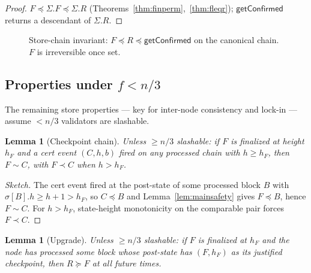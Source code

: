 \documentclass{article}
\newcommand{\genesis}{\ensuremath{B_{\mathrm{gen}}}}
\newcommand{\getConfirmed}{\textsf{getConfirmed}\xspace}
\theoremstyle{plain}
\newtheorem{lemma}[theorem]{Lemma}
\theoremstyle{definition}
\theoremstyle{remark}
\begin{document}
\begin{proof}[Proof] $F \preceq \Sigma.F \preceq \Sigma.R$ (Theorems~\ref{thm:finperm},~\ref{thm:fleqr}); $\getConfirmed$ returns a descendant of $\Sigma.R$. \end{proof}

\begin{figure}[H]
\centering
{}
\caption{Store-chain invariant: $F \preceq R \preceq \getConfirmed$ on the canonical chain. $F$ is irreversible once set.}\label{fig:store-chain}
\end{figure}

\subsection{Properties under $f < n/3$}

The remaining store properties --- key for inter-node consistency and lock-in --- assume $< n/3$ validators are slashable.

\begin{lemma}[Checkpoint chain]\label{lem:certchain}
Unless $\geq n/3$ slashable: if $F$ is finalized at height $h_F$ and a cert event $(C, h, b)$ fired on any processed chain with $h \geq h_F$, then $F \sim C$, with $F \prec C$ when $h > h_F$.
\end{lemma}

\begin{proof}[Sketch]
The cert event fired at the post-state of some processed block $B$ with $\sigma[B].h \geq h+1 > h_F$, so $C \preceq B$ and Lemma~\ref{lem:mainsafety} gives $F \preceq B$, hence $F \sim C$. For $h > h_F$, state-height monotonicity on the comparable pair forces $F \prec C$.
\end{proof}

\begin{lemma}[Upgrade]\label{lem:upgrade}
Unless $\geq n/3$ slashable: if $F$ is finalized at $h_F$ and the node has processed some block whose post-state has $(F, h_F)$ as its justified checkpoint, then $R \succeq F$ at all future times.
\end{lemma}
\end{document}
